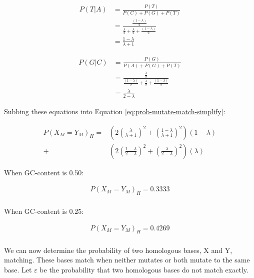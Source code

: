 \documentclass{article}
\begin{document}
\begin{equation}
\begin{split}
  P(T|A) &= \frac{P(T)}{P(C) + P(G) + P(T)} \\
    &= \frac{\frac{(1 - \lambda)}{2}}{\frac{\lambda}{2} + \frac{\lambda}{2} + \frac{(1 - \lambda)}{2}} \\
    &= \frac{1 - \lambda}{\lambda + 1}
\end{split}
\end{equation}

\begin{equation}
\begin{split}
  P(G|C) &= \frac{P(G)}{P(A) + P(G) + P(T)} \\
    &= \frac{\frac{\lambda}{2}}{\frac{(1 - \lambda)}{2} + \frac{\lambda}{2} + \frac{(1 - \lambda)}{2}} \\
    &= \frac{\lambda}{2 - \lambda}
\end{split}
\end{equation}
  
Subbing these equations into Equation \ref{eq:prob-mutate-match-simplify}:

\begin{equation}
\begin{split}
  P(X_{M} = Y_{M})_{H} = &\left(2 \left(\frac{\lambda}{\lambda + 1}\right)^2 + \left(\frac{1 - \lambda}{\lambda + 1}\right)^2\right)(1 - \lambda) \\
  + &\left(2 \left(\frac{1 - \lambda}{2 - \lambda}\right)^2 + \left(\frac{\lambda}{2 - \lambda}\right)^2\right)(\lambda)
\end{split}
\end{equation}
  
When GC-content is 0.50:
  
\begin{equation}
\begin{split}  
  P(X_{M} = Y_{M})_{H} = 0.3333 \\
\end{split}
\end{equation}
  
When GC-content is 0.25:
  
\begin{equation}
\begin{split}  
  P(X_{M} = Y_{M})_{H} = 0.4269 \\
\end{split}
\end{equation}
  
We can now determine the probability of two homologous bases, X and Y, matching. These bases match when neither mutates or both mutate to the same base. Let \(\varepsilon\) be the probability that two homologous bases do not match exactly.
  
\end{document}
